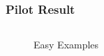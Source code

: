 \documentclass[aspectratio=169]{beamer}
\begin{document}
    \begin{frame}
        \frametitle{Pilot Result}
        \begin{columns}
            \begin{column}{.4\linewidth}
                \begin{figure}[htbp]
                    \centering
                    \quad
                    \caption{Easy Examples}
                \end{figure}
            \end{column}
            \begin{column}{.4\linewidth}
                \begin{figure}[htbp]
                    \centering
                    \quad
\end{figure}
\end{column}
\end{columns}
\end{frame}
\end{document}
